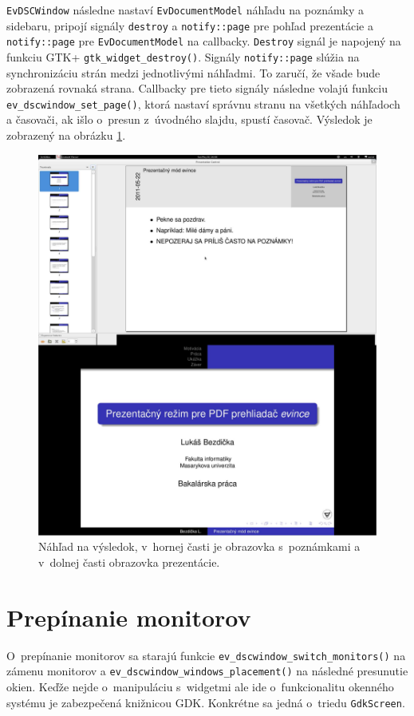 \documentclass[12pt,oneside,final]{fithesis2}
\begin{document}
\texttt{EvDSCWindow} následne nastaví \texttt{EvDocumentModel} náhľadu na poznámky a sidebaru, pripojí signály \texttt{destroy} a \texttt{notify::page} pre pohľad prezentácie a \texttt{notify::page} pre \texttt{EvDocumentModel} na callbacky. \texttt{Destroy} signál je napojený na funkciu GTK+ \texttt{gtk\_\-widget\_\-destroy()}. Signály \texttt{notify::page} slúžia na synchronizáciu strán medzi jednotlivými náhľadmi. To zaručí, že všade bude zobrazená rovnaká strana. Callbacky pre tieto signály následne volajú funkciu \texttt{ev\_\-dscwindow\_\-set\_\-page()}, ktorá nastaví správnu stranu na všetkých náhľadoch a časovači, ak išlo o~presun z~úvodného slajdu, spustí časovač. Výsledok je zobrazený na obrázku \ref{work}.
\begin{figure}[hbpt]
\includegraphics[width=\linewidth]{poznamky.pdf}
\caption{Náhľad na výsledok, v~hornej časti je obrazovka s~poznámkami a v~dolnej časti obrazovka prezentácie.}
\label{work}
\end{figure}
\section{Prepínanie monitorov}
O~prepínanie monitorov sa starajú funkcie \texttt{ev\_\-dscwindow\_\-switch\_\-monitors()} na zámenu monitorov a \texttt{ev\_\-dscwindow\_\-windows\_\-placement()} na následné presunutie okien. Keďže nejde o~manipuláciu s~widgetmi ale ide o~funkcionalitu okenného systému je zabezpečená knižnicou GDK. Konkrétne sa jedná o~triedu \texttt{GdkScreen}.
\end{document}
